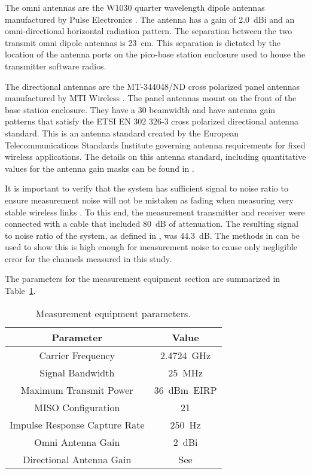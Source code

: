 \documentclass[12pt]{IEEEtran}
\begin{document}
The omni antennas are the W1030 quarter wavelength dipole antennas manufactured by Pulse Electronics \cite{w1030-antenna-2014}.  The antenna has a gain of 2.0~dBi and an omni-directional horizontal radiation pattern.  The separation between the two transmit omni dipole antennas is 23~cm.  This separation is dictated by the location of the antenna ports on the pico-base station enclosure used to house the transmitter software radios.

The directional antennas are the MT-344048/ND cross polarized panel antennas manufactured by MTI Wireless \cite{mt344048-antenna-2014}.  The panel antennas mount on the front of the base station enclosure.  They have a 30 beamwidth and have antenna gain patterns that satisfy the ETSI EN 302 326-3 cross polarized directional antenna standard. This is an antenna standard created by the European Telecommunications Standards Institute governing antenna requirements for fixed wireless applications.  The details on this antenna standard, including quantitative values for the antenna gain masks can be found in \cite{etsi-ants}.   

It is important to verify that the system has sufficient signal to noise ratio to ensure measurement noise will not be mistaken as fading when measuring very stable wireless links \cite{ahumada-l-2005}.  To this end, the measurement transmitter and receiver were connected with a cable that included 80~dB of attenuation.  The resulting signal to noise ratio of the system, as defined in \cite{ahumada-l-2005}, was 44.3~dB.  The methods in \cite{ahumada-l-2005} can be used to show this is high enough for measurement noise to cause only negligible error for the channels measured in this study.

The parameters for the measurement equipment section are summarized in Table~\ref{tb.equip}.
  

\begin{table}[htbp]
  \centering
  \begin{tabular}{|c|c|}
    \hline
    Parameter & Value \\
    \hline\hline
    Carrier Frequency & 2.4724~GHz \\
    Signal Bandwidth & 25~MHz \\
    Maximum Transmit Power & 36~dBm~EIRP \\
    MISO Configuration & 21 \\
    Impulse Response Capture Rate & 250~Hz \\
    Omni Antenna Gain & 2~dBi \\
    Directional Antenna Gain & See \cite{etsi-ants}\\
    \hline
  \end{tabular}
  \caption{Measurement equipment parameters.}
  \label{tb.equip}
\end{table}
\end{document}
